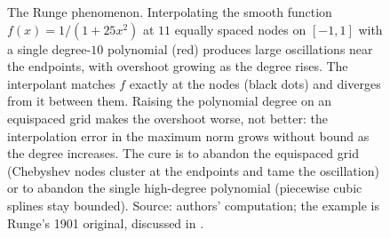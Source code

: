 \begin{figure}[ht]
\centering
{}
\caption[Runge phenomenon]{The Runge phenomenon. Interpolating the
smooth function $f(x) = 1/(1 + 25 x^{2})$ at $11$ equally spaced nodes
on $[-1, 1]$ with a single degree-$10$ polynomial (red) produces large
oscillations near the endpoints, with overshoot growing as the degree
rises. The interpolant matches $f$ exactly at the nodes (black dots) and
diverges from it between them. Raising the polynomial degree on an
equispaced grid makes the overshoot worse, not better: the interpolation
error in the maximum norm grows without bound as the degree increases.
The cure is to abandon the equispaced grid (Chebyshev nodes cluster at
the endpoints and tame the oscillation) or to abandon the single
high-degree polynomial (piecewise cubic splines stay bounded). Source:
authors' computation; the example is Runge's 1901 original, discussed in
\cite[ch.~5]{text:v2ch05-burden-faires-numerical-2015}.}
\label{fig:vol02:ch16:runge-phenomenon}
\end{figure}

